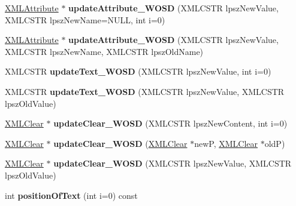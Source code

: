 \begin{DoxyCompactItemize}
\item 
\hypertarget{struct_x_m_l_node_aab4e4f09a253842ec329f3af90b74cf9}{}\label{struct_x_m_l_node_aab4e4f09a253842ec329f3af90b74cf9} 
\hyperlink{struct_x_m_l_attribute}{X\+M\+L\+Attribute} $\ast$ {\bfseries update\+Attribute\+\_\+\+W\+O\+SD} (X\+M\+L\+C\+S\+TR lpsz\+New\+Value, X\+M\+L\+C\+S\+TR lpsz\+New\+Name=N\+U\+LL, int i=0)
\item 
\hypertarget{struct_x_m_l_node_a25e0857638217206b11ee8fe99f7ed86}{}\label{struct_x_m_l_node_a25e0857638217206b11ee8fe99f7ed86} 
\hyperlink{struct_x_m_l_attribute}{X\+M\+L\+Attribute} $\ast$ {\bfseries update\+Attribute\+\_\+\+W\+O\+SD} (X\+M\+L\+C\+S\+TR lpsz\+New\+Value, X\+M\+L\+C\+S\+TR lpsz\+New\+Name, X\+M\+L\+C\+S\+TR lpsz\+Old\+Name)
\item 
\hypertarget{struct_x_m_l_node_adcff1825b8c39743e35df76db9d0a72d}{}\label{struct_x_m_l_node_adcff1825b8c39743e35df76db9d0a72d} 
X\+M\+L\+C\+S\+TR {\bfseries update\+Text\+\_\+\+W\+O\+SD} (X\+M\+L\+C\+S\+TR lpsz\+New\+Value, int i=0)
\item 
\hypertarget{struct_x_m_l_node_a79d26f52b800cb5f413cda3b08c4b89b}{}\label{struct_x_m_l_node_a79d26f52b800cb5f413cda3b08c4b89b} 
X\+M\+L\+C\+S\+TR {\bfseries update\+Text\+\_\+\+W\+O\+SD} (X\+M\+L\+C\+S\+TR lpsz\+New\+Value, X\+M\+L\+C\+S\+TR lpsz\+Old\+Value)
\item 
\hypertarget{struct_x_m_l_node_a70340d5baee0f1789149b459c9861b03}{}\label{struct_x_m_l_node_a70340d5baee0f1789149b459c9861b03} 
\hyperlink{struct_x_m_l_clear}{X\+M\+L\+Clear} $\ast$ {\bfseries update\+Clear\+\_\+\+W\+O\+SD} (X\+M\+L\+C\+S\+TR lpsz\+New\+Content, int i=0)
\item 
\hypertarget{struct_x_m_l_node_a25a713d21457706eabd8658bbce0b180}{}\label{struct_x_m_l_node_a25a713d21457706eabd8658bbce0b180} 
\hyperlink{struct_x_m_l_clear}{X\+M\+L\+Clear} $\ast$ {\bfseries update\+Clear\+\_\+\+W\+O\+SD} (\hyperlink{struct_x_m_l_clear}{X\+M\+L\+Clear} $\ast$newP, \hyperlink{struct_x_m_l_clear}{X\+M\+L\+Clear} $\ast$oldP)
\item 
\hypertarget{struct_x_m_l_node_a0b46f3ed1681e355e30120c43c410767}{}\label{struct_x_m_l_node_a0b46f3ed1681e355e30120c43c410767} 
\hyperlink{struct_x_m_l_clear}{X\+M\+L\+Clear} $\ast$ {\bfseries update\+Clear\+\_\+\+W\+O\+SD} (X\+M\+L\+C\+S\+TR lpsz\+New\+Value, X\+M\+L\+C\+S\+TR lpsz\+Old\+Value)
\item 
\hypertarget{struct_x_m_l_node_a3037f2fb4ce172d3f5156d9707af5c10}{}\label{struct_x_m_l_node_a3037f2fb4ce172d3f5156d9707af5c10} 
int {\bfseries position\+Of\+Text} (int i=0) const

\end{DoxyCompactItemize}
